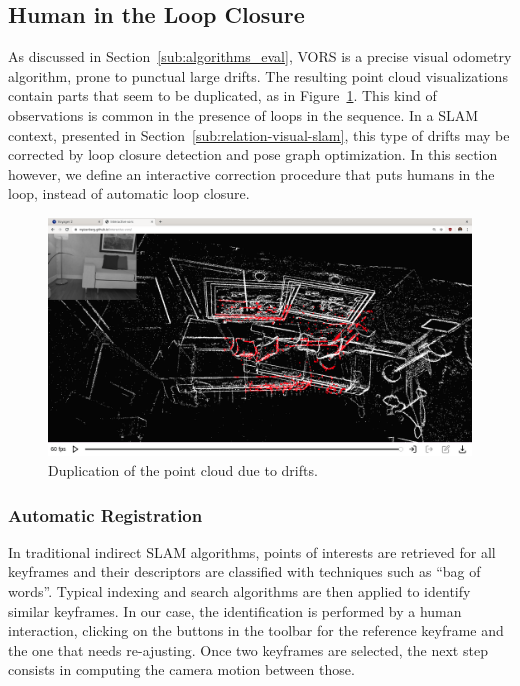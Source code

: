 \subsection{Human in the Loop Closure}%
\label{sub:human-loop-closure}

As discussed in Section~\ref{sub:algorithms_eval},
VORS is a precise visual odometry algorithm, prone to punctual large drifts.
The resulting point cloud visualizations contain parts that seem to be duplicated,
as in Figure~\ref{fig:interactive-vors-drift}.
This kind of observations is common in the presence of loops in the sequence.
In a SLAM context, presented in Section~\ref{sub:relation-visual-slam},
this type of drifts may be corrected by loop closure detection and pose graph optimization.
In this section however, we define an interactive correction procedure
that puts humans in the loop, instead of automatic loop closure.

\begin{figure}[ht]
	\centering
	\includegraphics[width=\linewidth]{assets/img/interactive-vors-drift.png}
	\caption{Duplication of the point cloud due to drifts.}%
	\label{fig:interactive-vors-drift}
\end{figure}

\subsubsection{Automatic Registration}%

In traditional indirect SLAM algorithms, points of interests are retrieved for all keyframes
and their descriptors are classified with techniques such as ``bag of words''.
Typical indexing and search algorithms are then applied to identify similar keyframes.
In our case, the identification is performed by a human interaction,
clicking on the buttons in the toolbar for the reference keyframe
and the one that needs re-ajusting.
Once two keyframes are selected, the next step consists in computing
the camera motion between those.

